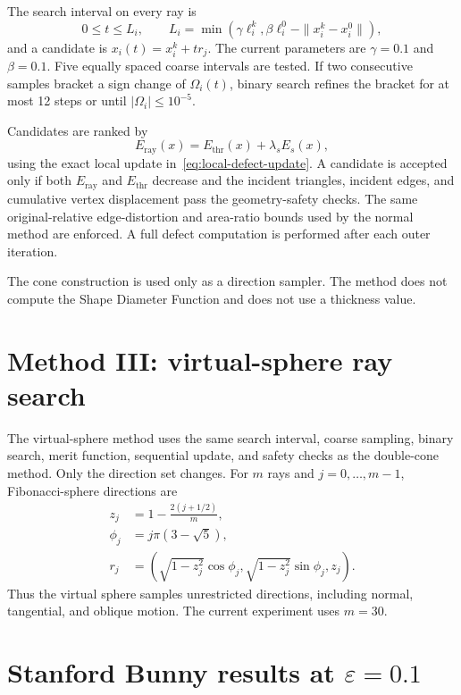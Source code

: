 \documentclass[10pt]{article}
\newcommand{\eps}{\varepsilon}
\begin{document}
The search interval on every ray is
\begin{equation}
0\leq t\leq L_i,
\qquad
L_i=\min\left(\gamma\ell_i^k,
\beta\ell_i^0-\|x_i^k-x_i^0\|\right),
\label{eq:ray-bound}
\end{equation}
and a candidate is $x_i(t)=x_i^k+tr_j$.  The current parameters are
$\gamma=0.1$ and $\beta=0.1$.  Five equally spaced coarse intervals are
tested.  If two consecutive samples bracket a sign change of $\Omega_i(t)$,
binary search refines the bracket for at most 12 steps or until
$|\Omega_i|\leq10^{-5}$.

Candidates are ranked by
\begin{equation}
E_{\mathrm{ray}}(x)=E_{\mathrm{thr}}(x)+\lambda_sE_s(x),
\label{eq:ray-merit}
\end{equation}
using the exact local update in~\eqref{eq:local-defect-update}.  A candidate is
accepted only if both $E_{\mathrm{ray}}$ and $E_{\mathrm{thr}}$ decrease and
the incident triangles, incident edges, and cumulative vertex displacement
pass the geometry-safety checks.  The same original-relative edge-distortion
and area-ratio bounds used by the normal method are enforced.  A full defect
computation is performed after each outer iteration.

The cone construction is used only as a direction sampler.  The method does
not compute the Shape Diameter Function and does not use a thickness value.

\section{Method III: virtual-sphere ray search}

The virtual-sphere method uses the same search interval, coarse sampling,
binary search, merit function, sequential update, and safety checks as the
double-cone method.  Only the direction set changes.  For $m$ rays and
$j=0,\ldots,m-1$, Fibonacci-sphere directions are
\begin{align}
z_j &= 1-\frac{2(j+1/2)}{m},\\
\phi_j &= j\pi(3-\sqrt5),\\
r_j &= \left(\sqrt{1-z_j^2}\cos\phi_j,
\sqrt{1-z_j^2}\sin\phi_j,z_j\right).
\label{eq:sphere-rays}
\end{align}
Thus the virtual sphere samples unrestricted directions, including normal,
tangential, and oblique motion.  The current experiment uses $m=30$.

\section{Stanford Bunny results at \texorpdfstring{$\eps=0.1$}{epsilon=0.1}}
\end{document}
